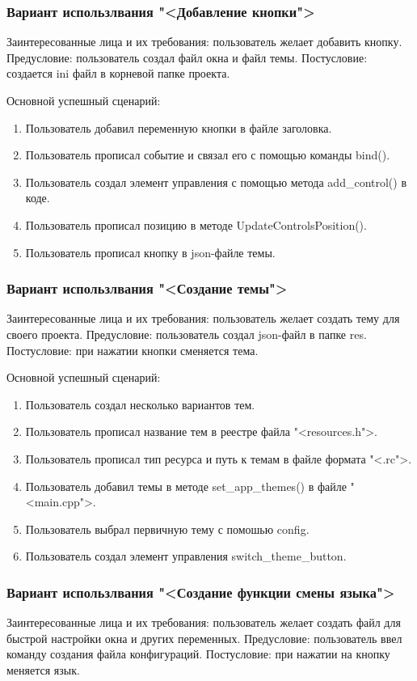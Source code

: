 \subsubsection{Вариант использлвания "<Добавление кнопки">}
Заинтересованные лица и их требования: пользователь желает добавить кнопку.
Предусловие: пользователь создал файл окна и файл темы.
Постусловие: создается ini файл в корневой папке проекта.

Основной успешный сценарий:
\begin{enumerate}
	\item Пользователь добавил переменную кнопки в файле заголовка.
	\item Пользователь прописал событие и связал его с помощью команды bind().
	\item Пользователь создал элемент управления с помощью метода add{\_}control() в коде.
	\item Пользователь прописал позицию в методе UpdateControlsPosition().
	\item Пользователь прописал кнопку в json-файле темы.
\end{enumerate}

\subsubsection{Вариант использлвания "<Создание темы">}
Заинтересованные лица и их требования: пользователь желает создать тему для своего проекта.
Предусловие: пользователь создал json-файл в папке res.
Постусловие: при нажатии кнопки сменяется тема.

Основной успешный сценарий:
\begin{enumerate}
	\item Пользователь создал несколько вариантов тем.
	\item Пользователь прописал название тем в реестре файла "<resources.h">.
	\item Пользователь прописал тип ресурса и путь к темам в файле формата "<.rc">.
	\item Пользователь добавил темы в методе set{\_}app{\_}themes() в файле "<main.cpp">.
	\item Пользователь выбрал первичную тему с помошью config.
	\item Пользователь создал элемент управления switch{\_}theme{\_}button.
\end{enumerate}

\subsubsection{Вариант использлвания "<Создание функции смены языка">}
Заинтересованные лица и их требования: пользователь желает создать файл для быстрой настройки окна и других переменных.
Предусловие: пользователь ввел команду создания файла конфигураций.
Постусловие: при нажатии на кнопку меняется язык.

